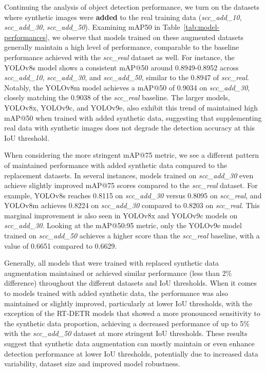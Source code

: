 Continuing the analysis of object detection performance, we turn on the datasets where synthetic images were \textbf{added} to the real training data (\textit{scc\_add\_10}, \textit{scc\_add\_30}, \textit{scc\_add\_50}).
Examining mAP\@50 in Table~\ref{tab:model-performances}, we observe that models trained on these augmented datasets generally maintain a high level of performance, comparable to the baseline performance achieved with the \textit{scc\_real} dataset as well.
For instance, the YOLOv8s model shows a consistent mAP@50 around 0.8949-0.8952 across \textit{scc\_add\_10}, \textit{scc\_add\_30}, and \textit{scc\_add\_50}, similar to the 0.8947 of \textit{scc\_real}.
Notably, the YOLOv8m model achieves a mAP@50 of 0.9034 on \textit{scc\_add\_30}, closely matching the 0.9038 of the \textit{scc\_real} baseline.
The larger models, YOLOv8x, YOLOv9c, and YOLOv9e, also exhibit this trend of maintained high mAP@50 when trained with added synthetic data, suggesting that supplementing real data with synthetic images does not degrade the detection accuracy at this IoU threshold.

When considering the more stringent mAP@75 metric, we see a different pattern of maintained performance with added synthetic data compared to the replacement datasets.
In several instances, models trained on \textit{scc\_add\_30} even achieve slightly improved mAP@75 scores compared to the \textit{scc\_real} dataset.
For example, YOLOv8s reaches 0.8115 on \textit{scc\_add\_30} versus 0.8095 on \textit{scc\_real}, and YOLOv8m achieves 0.8224 on \textit{scc\_add\_30} compared to 0.8203 on \textit{scc\_real}.
This marginal improvement is also seen in YOLOv8x and YOLOv9c models on \textit{scc\_add\_30}.
Looking at the mAP@50:95 metric, only the YOLOv9e model trained on \textit{scc\_add\_50} achieves a higher score than the \textit{scc\_real} baseline, with a value of 0.6651 compared to 0.6629.

Generally, all models that were trained with replaced synthetic data augmentation maintained or achieved similar performance (less than 2\% difference) throughout the different datasets and IoU thresholds.
When it comes to models trained with added synthetic data, the performance was also maintained or slightly improved, particularly at lower IoU thresholds, with the exception of the RT-DETR models that showed a more pronounced sensitivity to the synthetic data proportion, achieving a
decreased performance of up to 5\% with the \textit{scc\_add\_50} dataset at more stringent IoU thresholds.
These results suggest that synthetic data augmentation can mostly maintain or even enhance detection performance at lower IoU thresholds, potentially due to increased data variability, dataset size and improved model robustness.


